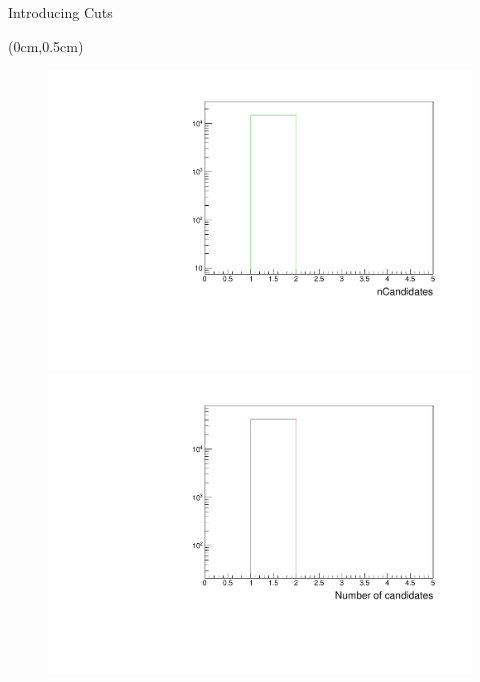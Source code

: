 \documentclass[8pt]{beamer}
\begin{document}
\begin{frame}{Introducing Cuts}
\begin{textblock*}{11cm}(0cm,0.5cm)
\begin{figure}[h!]
	\centering
	\pause[4]
	\begin{minipage}[b]{0.45\linewidth}
		\centering
		\includegraphics[width=\textwidth]{VBilder/nCandNoMCInfo.pdf}
	\end{minipage}
	\hspace{0.5cm}
	\pause[5]
	\begin{minipage}[b]{0.45\linewidth}
		\centering
		\includegraphics[width=\textwidth]{VBilder/nCandData.pdf}
	\end{minipage}
	
\end{figure}

\end{textblock*}
\pause[4]


\end{frame}
\end{document}
